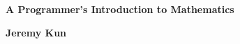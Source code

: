 \thispagestyle{empty}

\begin{vplace}[0.7]
\begin{center}
\bfseries \Large A Programmer's Introduction to Mathematics

\vspace{1cm}

\bfseries \large Jeremy Kun
\end{center}
\end{vplace}

